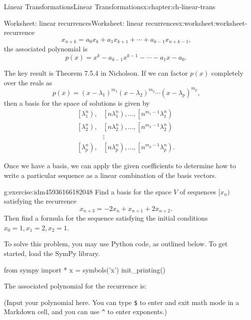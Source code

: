 \documentclass[oneside,10pt,]{book}
\newcommand{\mono}[1]{\texttt{#1}}
\numberwithin{equation}{section}
\newcommand{\amp}{&}
\begin{document}
\begin{chapterptx}{Linear Transformations}{}{Linear Transformations}{}{}{x:chapter:ch-linear-trans}
\begin{worksheet-section}{Worksheet: linear recurrences}{}{Worksheet: linear recurrences}{}{}{x:worksheet:worksheet-recurrence}
\begin{equation*}
x_{n+k} = a_0x_k + a_1x_{k+1}+\cdots + a_{k-1}x_{n+k-1}\text{,}
\end{equation*}
the associated polynomial is%
\begin{equation*}
p(x) = x^k - a_{k-1}x^{k-1}-\cdots -a_1x-a_0\text{.}
\end{equation*}
%
\par
The key result is Theorem 7.5.4 in Nicholson. If we can factor \(p(x)\) completely over the reals as%
\begin{equation*}
p(x) = (x-\lambda_1)^{m_1}(x-\lambda_2)^{m_2}\cdots (x-\lambda_p)^{m_p}\text{,}
\end{equation*}
then a basis for the space of solutions is given by%
\begin{align*}
\left[\lambda_1^n\right), \amp \left[n\lambda_1^n\right),\ldots, \left[n^{m_1-1}\lambda_1^n\right)\\
\left[\lambda_2^n\right), \amp \left[n\lambda_2^n\right),\ldots, \left[n^{m_2-1}\lambda_2^n\right)\\
\amp \vdots \\
\left[\lambda_p^n\right), \amp \left[n\lambda_p^n\right),\ldots, \left[n^{m_p-1}\lambda_p^n\right)\text{.}
\end{align*}
%
\par
Once we have a basis, we can apply the given coefficients to determine how to write a particular sequence as a linear combination of the basis vectors.%
\begin{divisionexercise}{1}{}{}{g:exercise:idm45936166182048}%
Find a basis for the space \(V\) of sequences \([x_n)\) satisfying the recurrence%
\begin{equation*}
x_{n+3}=-2x_n+x_{n+1}+2x_{n+2}\text{.}
\end{equation*}
Then find a formula for the sequence satisfying the initial conditions \(x_0=1, x_1=2, x_2=1\).%
\end{divisionexercise}%
To solve this problem, you may use Python code, as outlined below. To get started, load the SymPy library.%
\begin{sageinput}
from sympy import *
x = symbols('x')
init_printing()
\end{sageinput}
The associated polynomial for the recurrence is:%
\par
(Input your polynomial here. You can type \mono{\$} to enter and exit math mode in a Markdown cell, and you can use \mono{\textasciicircum{}} to enter exponents.)%
\par

\end{worksheet-section}
\end{chapterptx}
\end{document}
